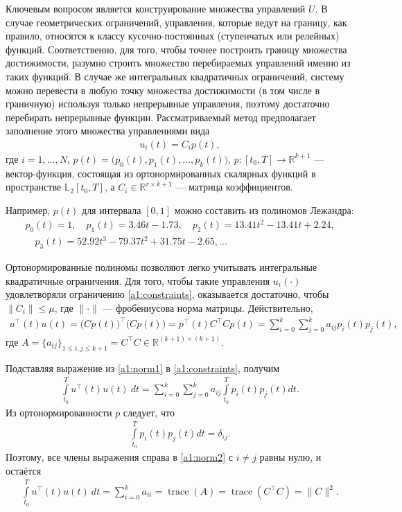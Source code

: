 \documentclass[../main.tex]{subfiles}
\begin{document}
Ключевым вопросом является конструирование множества управлений $U$.
 В случае геометрических ограничений, управления, которые ведут на границу, как правило, относятся к классу кусочно-постоянных (ступенчатых или релейных) функций.
 Соответственно, для того, чтобы точнее построить границу множества достижимости, разумно строить множество перебираемых управлений именно из таких функций. 
 В случае же интегральных квадратичных ограничений, систему можно перевести в любую точку множества достижимости (в том числе в граничную) используя только непрерывные управления, поэтому достаточно перебирать непрерывные функции. 
 Рассматриваемый метод предполагает заполнение этого множества управлениями вида 
 \begin{gather}\label{a1:control}
 	u_i(t) = C_i p (t),
 \end{gather}
 где $ i = 1, \dots, N$, $p(t) = \big(p_{0}(t),p_{1}(t),\dots,p_{k}(t)\big)$, $p: [t_0, {T}] \rightarrow \mathbb{R}^{k+1} $ --- вектор-функция, состоящая из ортонормированных скалярных функций в пространстве $\mathbb{L}_2[t_0, {T}]$, а $C_i \in \mathbb{R}^{r \times k+1}$ --- матрица коэффициентов. 
	 
 Например, $p(t)$ для интервала $[0,1]$ можно составить из полиномов Лежандра:
 \begin{gather*}
 	p_0(t) = 1, \quad p_1(t) = 3.46t-1.73, \quad p_2(t) = 13.41t^2 - 13.41t + 2.24, \\ \quad 
 	p_3(t) = 52.92t^3 - 79.37t^2+31.75t -2.65, ...
 \end{gather*}
 
 Ортонормированные полиномы позволяют легко учитывать интегральные квадратичные ограничения.
 Для того, чтобы такие управления $u_i(\cdot)$ удовлетворяли ограничению \eqref{a1:constraints}, оказывается достаточно, чтобы $\|C_i\| \leqslant \mu$, где $\|\cdot\| $ --- фробениусова норма матрицы.
 Действительно,
 \begin{gather}\label{a1:norm1}
 	 u^{\top}(t) u(t) = \big(C p(t)\big)^{\top} \big(C p(t)\big) = p^{\top}(t) C^{\top} C p(t) = \sum_{i=0}^k \sum_{j=0}^k a_{ij} p_i(t) p_j(t),
 \end{gather}
 где $ A = \{a_{ij}\}_{1\leqslant i,j \leqslant k + 1} = C^{\top} C \in \mathbb{R}^{(k+1) × (k+1)} $.
 
 Подставляя выражение из \eqref{a1:norm1} в \eqref{a1:constraints}, получим
 \begin{gather}\label{a1:norm2}
 		\int\limits_{t_0}^T u^{\top}(t) u(t) \ dt = \sum_{i=0}^k \sum_{j=0}^k a_{ij} \int\limits_{t_0}^T p_i(t) p_j(t) dt.
 \end{gather}
 Из ортонормированности $p$ следует, что 
 \begin{gather}
 	\int\limits_{t_0}^T p_i(t) p_j(t) dt = \delta_{ij}. 
 \end{gather}
 Поэтому, все члены выражения справа в \eqref{a1:norm2} с $i \neq j$ равны нулю, и остаётся 
 \begin{gather}
 	\int\limits_{t_0}^T u^{\top}(t) u(t) \ dt = \sum_{i=0}^k a_{ii} = \operatorname{trace}(A) = \operatorname{trace}(C^{\top} C) = \| C\|^2.
 \end{gather}
 
\end{document}
